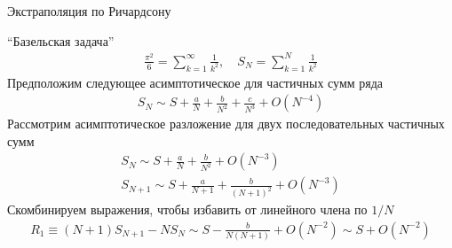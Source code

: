 \documentclass[10pt,pdf,hyperref={unicode},xcolor=dvipsnames]{beamer}
\begin{document}
\begin{frame}{Экстраполяция по Ричардсону}
    \vspace*{-0.5cm}
    \begin{block}{\enquote{Базельская задача}}
        \vspace*{-0.5cm}
        \begin{gather}
            \frac{\pi^2}{6} = \sum_{k=1}^\infty \frac{1}{k^2}, \quad S_N = \sum_{k=1}^N \frac{1}{k^2}
        \end{gather}
        Предположим следующее асимптотическое для частичных сумм ряда
        \begin{gather}
            S_N \sim S + \frac{a}{N} + \frac{b}{N^2} + \frac{c}{N^3} + O(N^{-4}) 
        \end{gather}
        Рассмотрим асимптотическое разложение для двух последовательных частичных сумм
        \begin{gather}
            S_N \sim S + \frac{a}{N} + \frac{b}{N^2} + O(N^{-3}) \\
            S_{N+1} \sim S + \frac{a}{N+1} + \frac{b}{(N+1)^2} + O(N^{-3})
        \end{gather}
        Скомбинируем выражения, чтобы избавить от линейного члена по $1/N$
        \begin{gather}
            R_1 \equiv (N+1) S_{N+1} - N S_N \sim S - \frac{b}{N(N+1)} + O(N^{-2}) \sim S + O(N^{-2}) 
        \end{gather}
    \end{block}
\end{frame}
\end{document}
